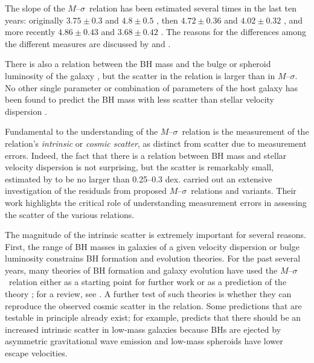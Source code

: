 \documentclass[twosided,letterpaper,numberedappendix]{emulateapj}
\newcommand{\msigma}   {\ensuremath{M}{--}\ensuremath{\sigma}}
\begin{document}
The slope of the \msigma\ relation has been estimated several times in
the last ten years: originally $3.75\pm 0.3$ \citep{gebhardtetal00}
and $4.8\pm 0.5$ \citep{fm00}, then $4.72\pm 0.36$ \citep{mf01a} and
$4.02\pm 0.32$ \citep{tremaineetal02}, and more recently $4.86\pm
0.43$ \citep{ff05} and $3.68 \pm 0.42$ \citep[for barless
galaxies;][]{graham08}.  The reasons for the differences among the
different measures are discussed by \citet{tremaineetal02} and
\citet{ff05}.  

There is also a relation between the BH mass
and the bulge or spheroid luminosity of the galaxy \cite[e.g.,][and the
ratio of BH mass to bulge mass was found to be
$2.2^{+1.6}_{-0.9} \times 10^{-3}$ by
\citealt{kr95}]{dressler89,kormendy93a,magorrianetal98}, but the scatter in the
relation is larger than in \msigma.  No other single parameter or
combination of parameters of the host galaxy has been found to predict
the BH mass with less scatter than stellar velocity dispersion
\citep[][but see also \citealt{mh03}, who find a comparable scatter
for the relation between BH mass and host bulge
mass.]{2003ApJ...583...92G}.

Fundamental to the understanding of the \msigma\ relation is the
measurement of the relation's \emph{intrinsic} or \emph{cosmic
scatter}, as distinct from scatter due to measurement errors.  Indeed,
the fact that there is a relation between BH mass and stellar
velocity dispersion is not surprising, but the scatter is remarkably
small, estimated by \citet{tremaineetal02} to be no larger than 
0.25--0.3 dex.  \citet{nfd06} carried out an extensive investigation
of the residuals from proposed \msigma\ relations and variants.  Their
work highlights the critical role of understanding measurement errors
in assessing the scatter of the various relations.
%

The magnitude of the intrinsic scatter is extremely important for
several reasons.  First, the range of BH masses in galaxies of a given
velocity dispersion or bulge luminosity constrains BH formation and
evolution theories.  For the past several years, many theories of BH
formation and galaxy evolution have used the \msigma\ relation either
as a starting point for further work or as a prediction of the theory
\citep[e.g.,][]{sr98,bs01,agr01,adamsetal03}; for a review, see
\citet{richstone04}.  A further test of such theories is whether they
can reproduce the observed cosmic scatter in the relation.  Some
predictions that are testable in principle already exist; for example,
\citet{volonteri07} predicts that there should be an increased
intrinsic scatter in low-mass galaxies because BHs are ejected by
asymmetric gravitational wave emission and low-mass spheroids have
lower escape velocities.
\end{document}
